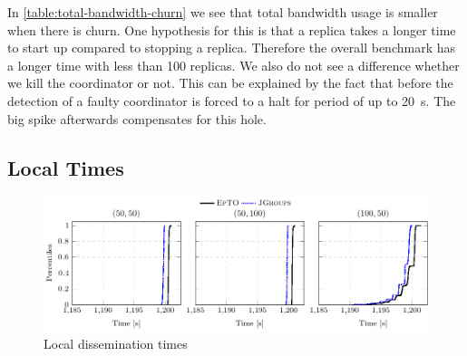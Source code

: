 In \autoref{table:total-bandwidth-churn} we see that \jgroups total bandwidth usage is smaller when there is churn. One hypothesis for this is that a \jgroups replica takes a longer time to start up compared to stopping a replica. Therefore the overall benchmark has a longer time with less than 100 replicas. We also do not see a difference whether we kill the coordinator or not. This can be explained by the fact that before the detection of a faulty coordinator \jgroups is forced to a halt for period of up to \SI{20}{\second}. The big spike afterwards compensates for this hole.
\subsection{Local Times}
\label{sub:local-times}
 \begin{figure}[hpt]
 	\centering
 	\includegraphics[width=\linewidth]{figures/local-times-nochurn.pdf}
 	\vspace{-2mm} 
 	\caption{Local dissemination times}
 	\vspace{-2mm}
 	\label{fig:local-times} 
 \end{figure}

